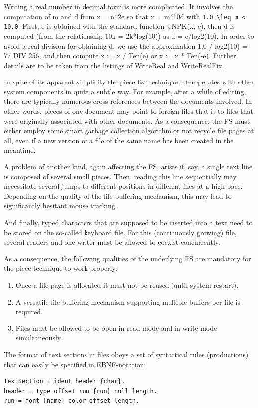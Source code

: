 Writing a real number in decimal form is more complicated. It involves the computation of m and d
from x = n*2e so that x = m*10d with \verb|1.0 \leq m < 10.0|. First, e is obtained with the standard function
UNPK(x, e), then d is computed (from the relationship 10k = 2k*log(10)) as d = e/log2(10). In order to
avoid a real division for obtaining d, we use the approximation 1.0 / log2(10) = 77 DIV 256, and then
compute x := x / Ten(e) or x := x * Ten(-e). Further details are to be taken from the listings of
WriteReal and WriteRealFix.

In spite of its apparent simplicity the piece list technique interoperates with other system
components in quite a subtle way. For example, after a while of editing, there are typically
numerous cross references between the documents involved. In other words, pieces of one
document may point to foreign files that is to files that were originally associated with other
documents. As a consequence, the FS must either employ some smart garbage collection
algorithm or not recycle file pages at all, even if a new version of a file of the same name has been
created in the meantime.

A problem of another kind, again affecting the FS, arises if, say, a single text line is
composed of several small pieces. Then, reading this line sequentially may necessitate several
jumps to different positions in different files at a high pace. Depending on the quality of the file
buffering mechanism, this may lead to significantly hesitant mouse tracking.

And finally, typed characters that are supposed to be inserted into a text need to be stored on the
so-called keyboard file. For this (continuously growing) file, several readers and one writer must be
allowed to coexist concurrently.

As a consequence, the following qualities of the underlying FS are mandatory for the piece
technique to work properly:
\begin{enumerate}
  \item Once a file page is allocated it must not be reused (until system restart).
  \item A versatile file buffering mechanism supporting multiple buffers per file is required.
  \item Files must be allowed to be open in read mode and in write mode simultaneously.
\end{enumerate}
The format of text sections in files obeys a set of syntactical rules (productions) that can easily be
specified in EBNF-notation:
\begin{verbatim}
TextSection = ident header {char}.
header = type offset run {run} null length.
run = font [name] color offset length.
\end{verbatim}

